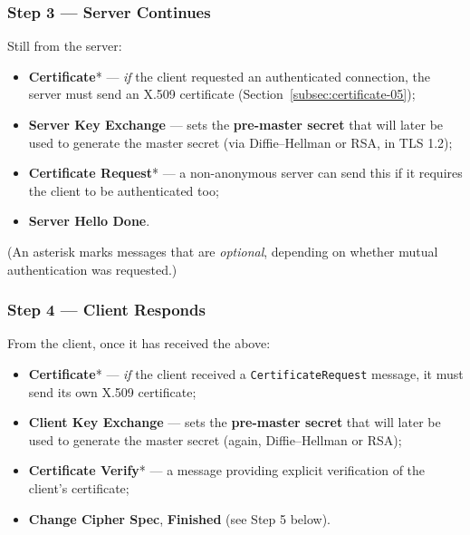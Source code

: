 \documentclass[12pt, a4paper]{article}
\begin{document}
\subsubsection*{Step 3 --- Server Continues}
Still from the server:
\begin{itemize}
    \item \textbf{Certificate}* --- \emph{if} the client requested an authenticated connection, the server must send an X.509 certificate (Section~\ref{subsec:certificate-05});
    \item \textbf{Server Key Exchange} --- sets the \textbf{pre-master secret} that will later be used to generate the master secret (via Diffie--Hellman or RSA, in TLS 1.2);
    \item \textbf{Certificate Request}* --- a non-anonymous server can send this if it requires the client to be authenticated too;
    \item \textbf{Server Hello Done}.
\end{itemize}
(An asterisk marks messages that are \emph{optional}, depending on whether mutual authentication was requested.)

\subsubsection*{Step 4 --- Client Responds}
From the client, once it has received the above:
\begin{itemize}
    \item \textbf{Certificate}* --- \emph{if} the client received a \texttt{CertificateRequest} message, it must send its own X.509 certificate;
    \item \textbf{Client Key Exchange} --- sets the \textbf{pre-master secret} that will later be used to generate the master secret (again, Diffie--Hellman or RSA);
    \item \textbf{Certificate Verify}* --- a message providing explicit verification of the client's certificate;
    \item \textbf{Change Cipher Spec}, \textbf{Finished} (see Step 5 below).
\end{itemize}
\end{document}
